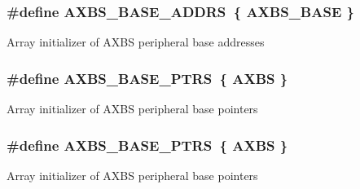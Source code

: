 \subsubsection[{\texorpdfstring{A\+X\+B\+S\+\_\+\+B\+A\+S\+E\+\_\+\+A\+D\+D\+RS}{AXBS_BASE_ADDRS}}]{\setlength{\rightskip}{0pt plus 5cm}\#define A\+X\+B\+S\+\_\+\+B\+A\+S\+E\+\_\+\+A\+D\+D\+RS~\{ {\bf A\+X\+B\+S\+\_\+\+B\+A\+SE} \}}\hypertarget{group__AXBS__Peripheral__Access__Layer_ga401a7e5a8976f1312fd3dcf0ffd7f45e}{}\label{group__AXBS__Peripheral__Access__Layer_ga401a7e5a8976f1312fd3dcf0ffd7f45e}
Array initializer of A\+X\+BS peripheral base addresses 
\subsubsection[{\texorpdfstring{A\+X\+B\+S\+\_\+\+B\+A\+S\+E\+\_\+\+P\+T\+RS}{AXBS_BASE_PTRS}}]{\setlength{\rightskip}{0pt plus 5cm}\#define A\+X\+B\+S\+\_\+\+B\+A\+S\+E\+\_\+\+P\+T\+RS~\{ {\bf A\+X\+BS} \}}\hypertarget{group__AXBS__Peripheral__Access__Layer_ga522ab97d5ed3e73f1cb3591c40ecc50e}{}\label{group__AXBS__Peripheral__Access__Layer_ga522ab97d5ed3e73f1cb3591c40ecc50e}
Array initializer of A\+X\+BS peripheral base pointers 
\subsubsection[{\texorpdfstring{A\+X\+B\+S\+\_\+\+B\+A\+S\+E\+\_\+\+P\+T\+RS}{AXBS_BASE_PTRS}}]{\setlength{\rightskip}{0pt plus 5cm}\#define A\+X\+B\+S\+\_\+\+B\+A\+S\+E\+\_\+\+P\+T\+RS~\{ {\bf A\+X\+BS} \}}\hypertarget{group__AXBS__Peripheral__Access__Layer_ga522ab97d5ed3e73f1cb3591c40ecc50e}{}\label{group__AXBS__Peripheral__Access__Layer_ga522ab97d5ed3e73f1cb3591c40ecc50e}
Array initializer of A\+X\+BS peripheral base pointers 
